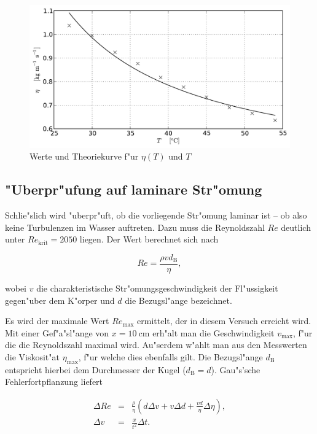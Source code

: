 		\begin{figure}[h!]
			\centering
			\includegraphics[width = 15cm]{img/plot2.pdf}
			\caption{Werte und Theoriekurve f"ur $\eta(T)$ und $T$}
			\label{fig:graph}
		\end{figure}

	\clearpage

	\subsection{"Uberpr"ufung auf laminare Str"omung}
		\label{sub:laminar}

		Schlie"slich wird "uberpr"uft, ob die vorliegende Str"omung laminar ist -- ob also keine Turbulenzen im Wasser auftreten.
		Dazu muss die Reynoldszahl $Re$ deutlich unter $Re_\mathrm{krit} = 2050$ liegen.
		Der Wert berechnet sich nach

		\begin{equation*}
			Re = \frac{\rho v d_\mathrm{B}}{\eta} ,
		\end{equation*}

		wobei $v$ die charakteristische Str"omungsgeschwindigkeit der Fl"ussigkeit gegen"uber dem K"orper und $d$ die Bezugsl"ange bezeichnet.

		Es wird der maximale Wert $Re_\mathrm{max}$ ermittelt, der in diesem Versuch erreicht wird.
		Mit einer Gef"a"sl"ange von $x = \SI{10}{\centi \meter}$ erh"alt man die Geschwindigkeit $v_\mathrm{max}$, f"ur die die Reynoldszahl maximal wird.
		Au"serdem w"ahlt man aus den Messwerten die Viskosit"at $\eta_\mathrm{max}$, f"ur welche dies ebenfalls gilt.
		Die Bezugsl"ange $d_\mathrm{B}$ entspricht hierbei dem Durch\-messer der Kugel ($d_\mathrm{B} = d$).
		Gau"s'sche Fehlerfortpflanzung liefert

		\begin{eqnarray*}
			\Delta Re & = & \frac{\rho}{\eta} \left( d \Delta v + v \Delta d + \frac{v d}{\eta} \Delta \eta \right) , \\
			\Delta v & = & \frac{x}{t^2} \Delta t.
		\end{eqnarray*}

